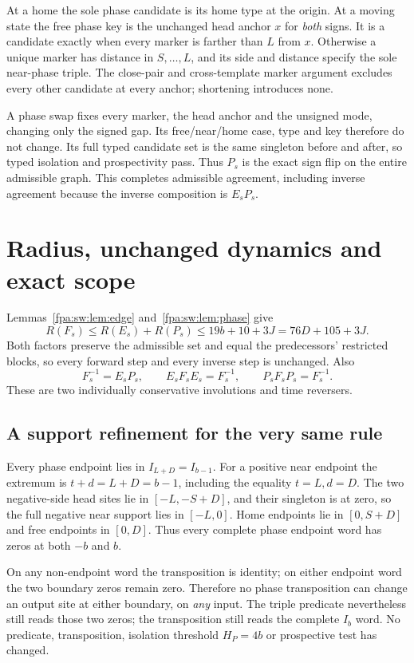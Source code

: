\documentclass[11pt,a4paper]{article}
\numberwithin{equation}{section}
\newcommand{\Es}{E_s}\newcommand{\Ps}{P_s}\newcommand{\Fs}{F_s}\newcommand{\Cand}{\mathcal C_P}
\begin{document}
At a home the sole phase candidate is its home type at the origin. At a moving state the free phase key is the unchanged head anchor $x$ for \emph{both} signs. It is a candidate exactly when every marker is farther than $L$ from $x$. Otherwise a unique marker has distance in $S,\ldots,L$, and its side and distance specify the sole near-phase triple. The close-pair and cross-template marker argument excludes every other candidate at every anchor; shortening introduces none.

A phase swap fixes every marker, the head anchor and the unsigned mode, changing only the signed gap. Its free/near/home case, type and key therefore do not change. Its full typed candidate set is the same singleton before and after, so typed isolation and prospectivity pass. Thus $\Ps$ is the exact sign flip on the entire admissible graph. This completes admissible agreement, including inverse agreement because the inverse composition is $\Es\Ps$.
\section{Radius, unchanged dynamics and exact scope}\label{fpa:sw:sec:consequences}
Lemmas~\ref{fpa:sw:lem:edge} and~\ref{fpa:sw:lem:phase} give
\[
R(\Fs)\le R(\Es)+R(\Ps)\le19b+10+3J=76D+105+3J.
\]
Both factors preserve the admissible set and equal the predecessors' restricted blocks, so every forward step and every inverse step is unchanged. Also
\[
\Fs^{-1}=\Es\Ps,\qquad \Es\Fs\Es=\Fs^{-1},\qquad
\Ps\Fs\Ps=\Fs^{-1}.
\]
These are two individually conservative involutions and time reversers.

\subsection{A support refinement for the very same rule}\label{fpa:sw:sec:refinement}
Every phase endpoint lies in $I_{L+D}=I_{b-1}$. For a positive near endpoint the extremum is $t+d=L+D=b-1$, including the equality $t=L,d=D$. The two negative-side head sites lie in $[-L,-S+D]$, and their singleton is at zero, so the full negative near support lies in $[-L,0]$. Home endpoints lie in $[0,S+D]$ and free endpoints in $[0,D]$. Thus every complete phase endpoint word has zeros at both $-b$ and $b$.

On any non-endpoint word the transposition is identity; on either endpoint word the two boundary zeros remain zero. Therefore no phase transposition can change an output site at either boundary, on \emph{any} input. The triple predicate nevertheless still reads those two zeros; the transposition still reads the complete $I_b$ word. No predicate, transposition, isolation threshold $H_P=4b$ or prospective test has changed.
\end{document}
